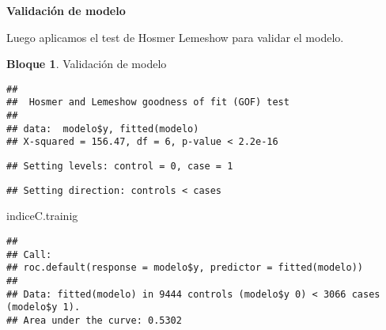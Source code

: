 \documentclass[
]{book}
\newenvironment{Shaded}{\begin{snugshade}}{\end{snugshade}}
\newcommand{\AttributeTok}[1]{\textcolor[rgb]{0.77,0.63,0.00}{#1}}
\newcommand{\CommentTok}[1]{\textcolor[rgb]{0.56,0.35,0.01}{\textit{#1}}}
\newcommand{\DecValTok}[1]{\textcolor[rgb]{0.00,0.00,0.81}{#1}}
\newcommand{\FunctionTok}[1]{\textcolor[rgb]{0.00,0.00,0.00}{#1}}
\newcommand{\NormalTok}[1]{#1}
\newcommand{\OtherTok}[1]{\textcolor[rgb]{0.56,0.35,0.01}{#1}}
\newcommand{\SpecialCharTok}[1]{\textcolor[rgb]{0.00,0.00,0.00}{#1}}
\theoremstyle{definition}
\theoremstyle{definition}
\newtheorem{example}{Bloque}[chapter]
\theoremstyle{definition}
\theoremstyle{definition}
\theoremstyle{remark}
\begin{document}
\textbf{Validación de modelo}

Luego aplicamos el test de Hosmer Lemeshow para validar el modelo.

\begin{example}
\protect\hypertarget{exm:bloque83nbm}{}\label{exm:bloque83nbm}Validación de modelo
\end{example}

\begin{Shaded}
\end{Shaded}

\begin{verbatim}
## 
##  Hosmer and Lemeshow goodness of fit (GOF) test
## 
## data:  modelo$y, fitted(modelo)
## X-squared = 156.47, df = 6, p-value < 2.2e-16
\end{verbatim}

\begin{Shaded}
\end{Shaded}

\begin{verbatim}
## Setting levels: control = 0, case = 1
\end{verbatim}

\begin{verbatim}
## Setting direction: controls < cases
\end{verbatim}

\begin{Shaded}
\begin{Highlighting}[]
\NormalTok{indiceC.trainig}
\end{Highlighting}
\end{Shaded}

\begin{verbatim}
## 
## Call:
## roc.default(response = modelo$y, predictor = fitted(modelo))
## 
## Data: fitted(modelo) in 9444 controls (modelo$y 0) < 3066 cases (modelo$y 1).
## Area under the curve: 0.5302
\end{verbatim}
\end{document}
